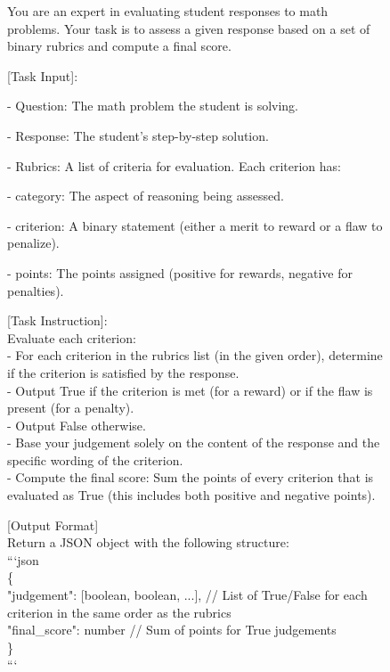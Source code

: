 \begin{figure}[ht]
    \centering
    \begin{lrbox}{\DSRPrompt}
    \begin{gptpromptbox}
    \begin{minipage}{0.95\linewidth}
    \raggedright
    \scriptsize\ttfamily
\setlength{\baselineskip}{1\baselineskip}
You are an expert in evaluating student responses to math problems. Your task is to assess a given response based on a set of binary rubrics and compute a final score.

[Task Input]:

- Question: The math problem the student is solving.

- Response: The student's step-by-step solution.

- Rubrics: A list of criteria for evaluation. Each criterion has:

\quad - category: The aspect of reasoning being assessed.
    
\quad - criterion: A binary statement (either a merit to reward or a flaw to penalize).
    
\quad - points: The points assigned (positive for rewards, negative for penalties).

[Task Instruction]:\\
Evaluate each criterion:\\
- For each criterion in the rubrics list (in the given order), determine if the criterion is satisfied by the response.\\
\quad - Output True if the criterion is met (for a reward) or if the flaw is present (for a penalty).\\
\quad - Output False otherwise. \\
- Base your judgement solely on the content of the response and the specific wording of the criterion.\\
- Compute the final score: Sum the points of every criterion that is evaluated as True (this includes both positive and negative points).

[Output Format]\\
Return a JSON object with the following structure:\\
```json\\
\{\\
  \quad "judgement": [boolean, boolean, ...],  // List of True/False for each criterion in the same order as the rubrics\\
  \quad "final\_score": number                  // Sum of points for True judgements\\
\}\\
```


\end{minipage}
\end{gptpromptbox}
\end{lrbox}
\end{figure}
